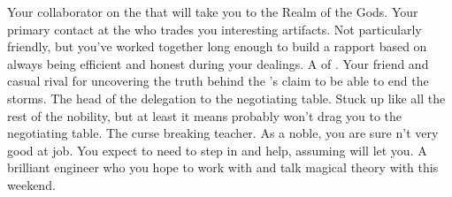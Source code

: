 \documentclass[char]{GL2020}
\begin{document}
\begin{contacts}
	\contact{\cFlowPriest{}} Your collaborator on the \iBeans{} that will take you to the Realm of the Gods.
	\contact{\cChupSecond{}} Your primary contact at the \pSc{} who trades you interesting artifacts. Not particularly friendly, but you’ve worked together long enough to build a rapport based on \cChupSecond{\them} always being efficient and honest during your dealings.
	\contact{\cHedonist{}} A \cHedonist{\cleric} of \cFarmGod{}. Your friend and casual rival for uncovering the truth behind the \pTech{}’s claim to be able to end the storms.
	\contact{\cEvil{}} The head of the \pFarm{} delegation to the negotiating table. Stuck up like all the rest of the nobility, but at least it means \cEvil{\they} probably won’t drag you to the negotiating table.
	\contact{\cPrince{}} The curse breaking teacher. As a noble, you are sure \cPrince{\they} \cPrince{\are}n’t very good at \cPrince{\their} job. You expect to need to step in and help, assuming \cPrince{} will let you.
	\contact{\cBunker{}} A brilliant engineer who you hope to work with and talk magical theory with this weekend.
\end{contacts}
\end{document}
